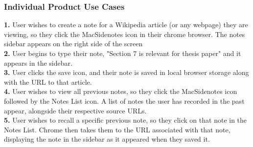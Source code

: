 \documentclass[12pt, titlepage]{article}
\begin{document}
\subsubsection{Individual Product Use Cases}
{\bf 1.} User wishes to create a note for a Wikipedia article (or any webpage) 
they are viewing, so they click the MacSidenotes icon in their chrome browser. 
The notes sidebar appears on the right side of the screen\\
{\bf 2.} User begins to type their note, "Section 7 is relevant for thesis 
paper" and it appears in the sidebar.\\
{\bf 3.} User clicks the save icon, and their note is saved in local browser 
storage along with the URL to that article.\\
{\bf 4.} User wishes to view all previous notes, so they click the MacSidenotes 
icon followed by the Notes List icon. A list of notes the user has recorded in 
the past appear, alongside their respective source URLs.\\
{\bf 5.} User wishes to recall a specific previous note, so they click on that 
note in the Notes List. Chrome then takes them to the URL associated with that 
note, displaying the note in the sidebar as it appeared when they saved it.
\end{document}
